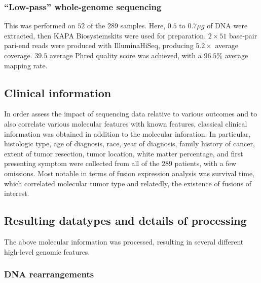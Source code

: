 \subsubsection{``Low-pass'' whole-genome sequencing}

This was performed on $52$ of the $289$ samples. Here, $0.5$ to
$0.7\mu g$ of DNA were extracted, then KAPA Biosystems\reg kits were
used for preparation. $2 \times 51$ base-pair pari-end reads were
produced with Illumina\reg HiSeq\tm, producing $5.2 \times$ average
coverage. $39.5$ average Phred quality score was achieved, with a
$96.5\%$ average mapping rate.

\subsection{Clinical information}

In order assess the impact of sequencing data relative to various
outcomes and to also correlate various molecular features with known
features, classical clinical information was obtained in addition to
the molecular inforation. In particular, histologic type, age of
diagnosis, race, year of diagnosis, family history of cancer, extent
of tumor resection, tumor location, white matter percentage, and first
presenting symptom were collected from all of the $289$ patients, with
a few omissions. Most notable in terms of fusion expression analysis
was survival time, which correlated molecular tumor type and
relatedly, the existence of fusions of interest.

\subsection{Resulting datatypes and details of processing}

The above molecular information was processed, resulting in several
different high-level genomic features.

\subsubsection{DNA rearrangements}

